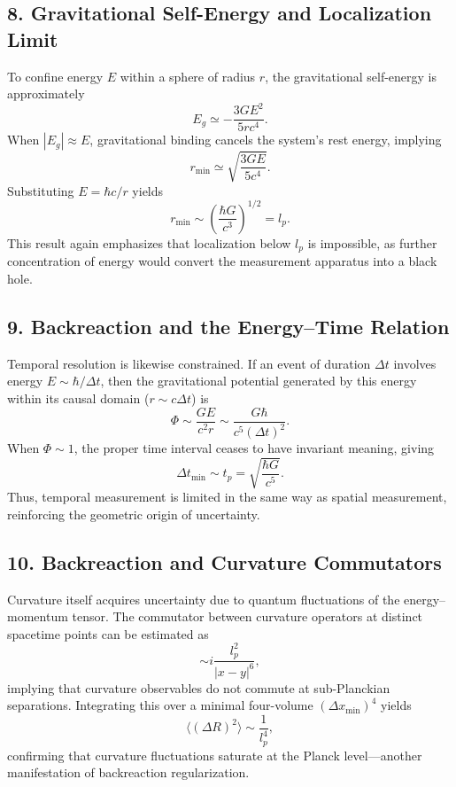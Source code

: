 \documentclass[11pt,oneside]{book}
\numberwithin{equation}{chapter}
\begin{document}
\subsection*{8. Gravitational Self-Energy and Localization Limit}

To confine energy $E$ within a sphere of radius $r$, the gravitational self-energy is approximately
\begin{equation}
E_g \simeq -\frac{3GE^2}{5r c^4}.
\end{equation}
When $|E_g| \approx E$, gravitational binding cancels the system’s rest energy, implying
\begin{equation}
r_{\min} \simeq \sqrt{\frac{3G E}{5c^4}}.
\end{equation}
Substituting $E = \hbar c / r$ yields
\begin{equation}
r_{\min} \sim \left(\frac{\hbar G}{c^3}\right)^{1/2} = l_p.
\end{equation}
This result again emphasizes that localization below $l_p$ is impossible, as further concentration of energy would convert the measurement apparatus into a black hole.

\subsection*{9. Backreaction and the Energy–Time Relation}

Temporal resolution is likewise constrained.  
If an event of duration $\Delta t$ involves energy $E \sim \hbar / \Delta t$, then the gravitational potential generated by this energy within its causal domain ($r\sim c\Delta t$) is
\begin{equation}
\Phi \sim \frac{GE}{c^2 r}
\sim \frac{G\hbar}{c^5 (\Delta t)^2}.
\end{equation}
When $\Phi \sim 1$, the proper time interval ceases to have invariant meaning, giving
\begin{equation}
\Delta t_{\min} \sim t_p = \sqrt{\frac{\hbar G}{c^5}}.
\end{equation}
Thus, temporal measurement is limited in the same way as spatial measurement, reinforcing the geometric origin of uncertainty.

\subsection*{10. Backreaction and Curvature Commutators}

Curvature itself acquires uncertainty due to quantum fluctuations of the energy–momentum tensor.  
The commutator between curvature operators at distinct spacetime points can be estimated as
\begin{equation}
[R(x),R(y)] \sim i\frac{l_p^2}{|x-y|^6},
\end{equation}
implying that curvature observables do not commute at sub-Planckian separations.  
Integrating this over a minimal four-volume $(\Delta x_{\min})^4$ yields
\begin{equation}
\langle (\Delta R)^2 \rangle \sim \frac{1}{l_p^4},
\end{equation}
confirming that curvature fluctuations saturate at the Planck level—another manifestation of backreaction regularization.
\end{document}
